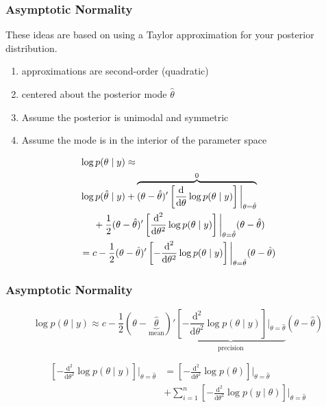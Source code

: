\documentclass{beamer}
\begin{document}
\begin{frame}
\frametitle{Asymptotic Normality}

These ideas are based on using a Taylor approximation for your posterior distribution. 
\begin{enumerate}
\item approximations are second-order (quadratic)
\item centered about the posterior mode $\hat{\theta}$
\item Assume the posterior is unimodal and symmetric
\item Assume the mode is in the interior of the parameter space
\end{enumerate}
\pause

\begin{align*}
&\log p(\theta \mid y ) \approx \\
&\log p(\hat{\theta} \mid y) + \overbrace{(\theta - \hat{\theta})'\left[ \frac{\text{d}}{\text{d}\theta} \log p(\theta \mid y) \right] \bigg|_{\theta = \hat{\theta}}}^{0}  \\
&\hspace{5mm}  + \frac{1}{2}(\theta - \hat{\theta})'\left[\frac{\text{d}^2}{\text{d}\theta^2} \log p(\theta \mid y)\right] \bigg|_{\theta = \hat{\theta}}(\theta - \hat{\theta}) \\
&= c  - \frac{1}{2}(\theta - \hat{\theta})'\left[-\frac{\text{d}^2}{\text{d}\theta^2} \log p(\theta \mid y)\right] \bigg|_{\theta = \hat{\theta}}(\theta - \hat{\theta})
\end{align*}

\end{frame}

\begin{frame}
\frametitle{Asymptotic Normality}

\[
\log p(\theta \mid y ) \approx 
c  - \frac{1}{2}(\theta - \underbrace{\hat{\theta} }_{\text{mean}} )' \underbrace{\left[-\frac{\text{d}^2}{\text{d}\theta^2} \log p(\theta \mid y)\right] \bigg|_{\theta = \hat{\theta}}}_{\text{precision} } (\theta - \hat{\theta})
\]

\begin{align*}
\left[-\frac{\text{d}^2}{\text{d}\theta^2} \log p(\theta \mid y)\right] \bigg|_{\theta = \hat{\theta}} 
&=
\left[-\frac{\text{d}^2}{\text{d}\theta^2} \log p(\theta)\right] \bigg|_{\theta = \hat{\theta}} \\
&+
\sum_{i=1}^n \left[-\frac{\text{d}^2}{\text{d}\theta^2} \log p(y \mid \theta)\right] \bigg|_{\theta = \hat{\theta}}
\end{align*}



\end{frame}
\end{document}

